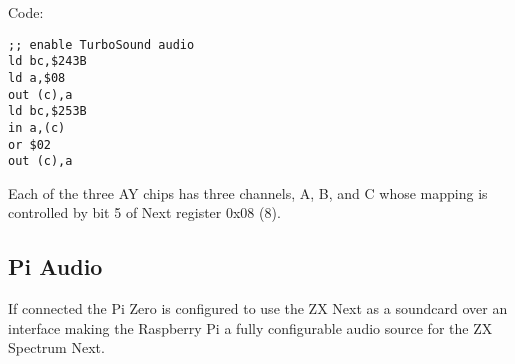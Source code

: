 Code:
\begin{verbatim}
;; enable TurboSound audio
ld bc,$243B
ld a,$08
out (c),a
ld bc,$253B
in a,(c)
or $02
out (c),a
\end{verbatim}

Each of the three AY chips has three channels, A, B, and C whose
mapping is controlled by bit 5 of Next register 0x08 (8).
















\subsection{Pi Audio}
If connected the Pi Zero is configured to use the ZX Next as a
soundcard over an \iis interface making the Raspberry Pi a fully
configurable audio source for the ZX Spectrum Next.
